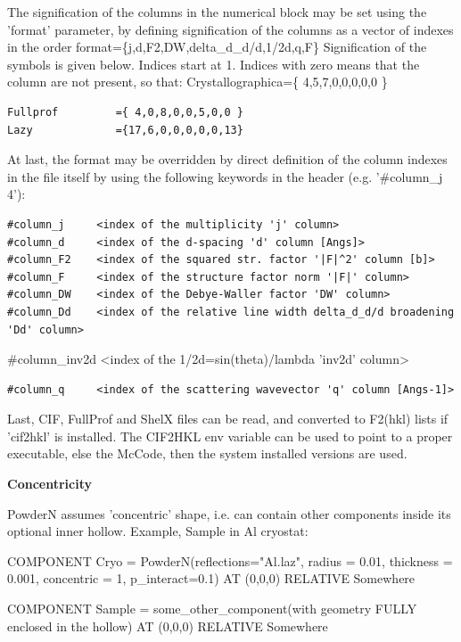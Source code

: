 The signification of the columns in the numerical block may be set using the 'format' parameter, by defining signification of the columns as a vector of indexes in the order format=\{j,d,F2,DW,delta\_d\_d/d,1/2d,q,F\} Signification of the symbols is given below. Indices start at 1. Indices with zero means that the column are not present, so that: Crystallographica=\{ 4,5,7,0,0,0,0,0 \}

\begin{verbatim}
Fullprof         ={ 4,0,8,0,0,5,0,0 }
Lazy             ={17,6,0,0,0,0,0,13}
\end{verbatim}

At last, the format may be overridden by direct definition of the column indexes in the file itself by using the following keywords in the header (e.g. '\#column\_j 4'):

\begin{verbatim}
#column_j     <index of the multiplicity 'j' column>
#column_d     <index of the d-spacing 'd' column [Angs]>
#column_F2    <index of the squared str. factor '|F|^2' column [b]>
#column_F     <index of the structure factor norm '|F|' column>
#column_DW    <index of the Debye-Waller factor 'DW' column>
#column_Dd    <index of the relative line width delta_d_d/d broadening 'Dd' column>
\end{verbatim}

\#column\_inv2d \textless{}index of the 1/2d=sin(theta)/lambda 'inv2d' column\textgreater{}

\begin{verbatim}
#column_q     <index of the scattering wavevector 'q' column [Angs-1]>
\end{verbatim}

Last, CIF, FullProf and ShelX files can be read, and converted to F2(hkl) lists if 'cif2hkl' is installed. The CIF2HKL env variable can be used to point to a proper executable, else the McCode, then the system installed versions are used.

\textbf{Concentricity}

PowderN assumes 'concentric' shape, i.e. can contain other components inside its optional inner hollow. Example, Sample in Al cryostat:

COMPONENT Cryo = PowderN(reflections="Al.laz", radius = 0.01, thickness = 0.001, concentric = 1, p\_interact=0.1) AT (0,0,0) RELATIVE Somewhere

COMPONENT Sample = some\_other\_component(with geometry FULLY enclosed in the hollow) AT (0,0,0) RELATIVE Somewhere

